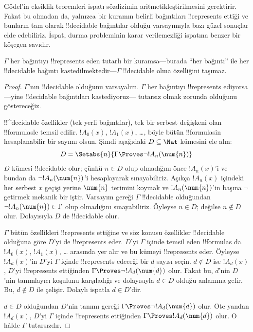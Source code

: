 



G\"odel'in eksiklik teoremleri ispatı sözdizimin aritmetikleştirilmesini
gerektirir. Fakat bu olmadan da, yalnızca bir kuramın belirli bağıntıları
!!{represents} ettiği ve bunların tam olarak !!{decidable} bağıntılar
olduğu varsayımıyla bazı güzel sonuçlar elde
edebiliriz. İspat, durma probleminin karar verilemezliği ispatına benzer bir
köşegen savıdır.

\begin{thm}
$\Gamma$ her bağıntıyı !!{represents} eden tutarlı bir kuramsa---burada
``her bağıntı'' ile her !!{decidable} bağıntı kastedilmektedir---$\Gamma$
!!{decidable} olma özelliğini taşımaz.
\end{thm}

\begin{proof}
$\Gamma$'nın !!{decidable} olduğunu varsayalım. $\Gamma$ her bağıntıyı
!!{represents} ediyorsa---yine !!{decidable} bağıntıları kastediyoruz---
tutarsız olmak zorunda olduğunu göstereceğiz.

!!^{decidable} özellikler (tek yerli bağıntılar), tek bir serbest değişkeni
olan !!{formula}s{}le temsil edilir. $!A_0(x)$, $!A_1(x)$, \dots, böyle
bütün !!{formula}s{}in hesaplanabilir bir sayımı olsun. Şimdi aşağıdaki
$D \subseteq \Nat$ kümesini ele alın:
\[
D = \Setabs{n}{\Gamma \Proves \lnot !A_n(\num{n})}
\]
$D$ kümesi !!{decidable} olur; çünkü $n \in D$ olup olmadığını önce
$!A_n(x)$'i ve bundan da $\lnot !A_n(\num{n})$'i hesaplayarak sınayabiliriz.
Açıkça $!A_n(x)$ içindeki her serbest $x$ geçişi yerine $\num{n}$ terimini
koymak ve $!A_n(\num{n})$'in başına $\lnot$ getirmek mekanik bir iştir.
Varsayım gereği $\Gamma$ !!{decidable} olduğundan
$\lnot !A_n(\num{n}) \in \Gamma$ olup olmadığını sınayabiliriz. Öyleyse
$n \in D$; değilse $n \notin D$ olur. Dolayısıyla $D$ de !!{decidable} olur.

$\Gamma$ bütün özellikleri !!{represents} ettiğine ve söz konusu özellikler
!!{decidable} olduğuna göre $D$'yi de !!{represents} eder. $D$'yi
$\Gamma$ içinde temsil eden !!{formula}s da $!A_0(x)$, $!A_1(x)$, \dots
arasında yer alır ve bu kümeyi !!{represents} eder. Öyleyse $!A_d(x)$'in
$D$'yi $\Gamma$ içinde !!{represents} edeceği bir $d$ sayısı
seçin. $d \notin D$ ise $!A_d(x)$, $D$'yi !!{represents} ettiğinden
$\Gamma \Proves \lnot !A_d(\num{d})$ olur. Fakat bu, $d$'nin $D$'nin
tanımlayıcı koşulunu karşıladığı ve dolayısıyla $d \in D$ olduğu anlamına
gelir. Bu, $d \notin D$ ile çelişir. Dolaylı ispatla $d \in D$'dir.

$d \in D$ olduğundan $D$'nin tanımı gereği
$\Gamma \Proves \lnot !A_d(\num{d})$ olur. Öte yandan $!A_d(x)$, $D$'yi
$\Gamma$ içinde !!{represents} ettiğinden $\Gamma \Proves !A_d(\num{d})$
olur. O hâlde $\Gamma$ tutarsızdır.
\end{proof}

